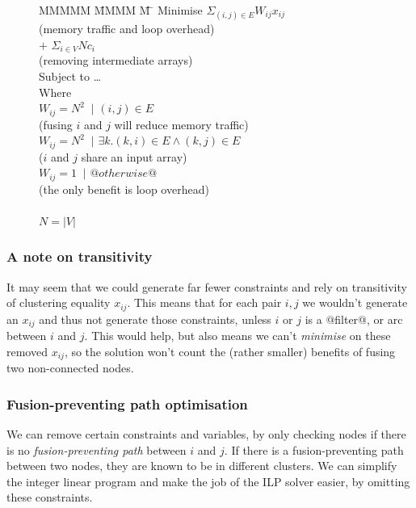 \begin{figure}[H]
\begin{tabbing}
MMMMM   \= MMMM \= M \= \kill
Minimise   \>     \> $\Sigma_{(i,j) \in E} W_{ij} x_{ij}$   \\
           \> \> \> (memory traffic and loop overhead)         \\
           \> $+$ \> $\Sigma_{i \in V} N c_i$  \\
           \> \> \> (removing intermediate arrays)         \\
Subject to \> \ldots                                \\
Where      \>                                       \\
           \> $W_{ij} = N^2$ \> $~|$ \> $(i,j) \in E $         \\
           \> \> \> (fusing $i$ and $j$ will reduce memory traffic)         \\
           \> $W_{ij} = N^2$ \> $~|$ \> $\exists k. (k,i) \in E \wedge (k,j) \in E $     \\
           \> \> \> ($i$ and $j$ share an input array)                                         \\
           \> $W_{ij} = 1$   \> $~|$ \> $@otherwise@$                                                  \\
           \> \> \> (the only benefit is loop overhead)                                        \\
           \\
           \> $N = |V|$
\end{tabbing}
\end{figure}


\subsubsection{A note on transitivity}
It may seem that we could generate far fewer constraints and rely on transitivity of clustering equality $x_{ij}$.
This means that for each pair $i,j$ we wouldn't generate an $x_{ij}$ and thus not generate those constraints, unless $i$ or $j$ is a @filter@, or arc between $i$ and $j$.
This would help, but also means we can't \emph{minimise} on these removed $x_{ij}$, so the solution won't count the (rather smaller) benefits of fusing two non-connected nodes.

\subsubsection{Fusion-preventing path optimisation}
\label{s:OptimisedConstraints}
We can remove certain constraints and variables, by only checking nodes if there is no \emph{fusion-preventing path} between $i$ and $j$.
If there is a fusion-preventing path between two nodes, they are known to be in different clusters.
We can simplify the integer linear program and make the job of the ILP solver easier, by omitting these constraints.

